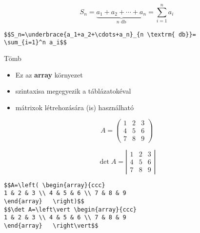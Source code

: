 \documentclass[11pt]{beamer}
\begin{document}
\begin{frame}[fragile]
$$S_n=\underbrace{a_1+a_2+\cdots+a_n}_{n \textrm{ db}}=\sum_{i=1}^n a_i$$
\vspace{1cm}
\begin{verbatim}
$$S_n=\underbrace{a_1+a_2+\cdots+a_n}_{n \textrm{ db}}=
\sum_{i=1}^n a_i$$
\end{verbatim}
\end{frame}

\begin{frame}[fragile]{Tömb}
\begin{itemize}
\item Ez az \textbf{array} környezet
\item szintaxisa megegyezik a táblázatokéval
\item mátrixok létrehozására (is) használható
\end{itemize}

\begin{multicols}{2}
$$A=\left( \begin{array}{ccc}
1 & 2 & 3 \\ 4 & 5 & 6 \\ 7 & 8 & 9
\end{array}   \right)$$

$$\det A=\left\vert \begin{array}{ccc}
1 & 2 & 3 \\ 4 & 5 & 6 \\ 7 & 8 & 9
\end{array}   \right\vert$$
\end{multicols}

\begin{verbatim}
$$A=\left( \begin{array}{ccc}
1 & 2 & 3 \\ 4 & 5 & 6 \\ 7 & 8 & 9
\end{array}   \right)$$
$$\det A=\left\vert \begin{array}{ccc}
1 & 2 & 3 \\ 4 & 5 & 6 \\ 7 & 8 & 9
\end{array}   \right\vert$$
\end{verbatim}
\end{frame}
\end{document}
